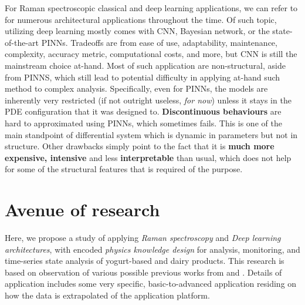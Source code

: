 \documentclass{iopjournal}
\begin{document}
For Raman spectroscopic classical and deep learning applications, we can refer to \cite{qi_recent_2023_progress,li_raman_2022,ren_raman_2023,poppe_deep_2024,deep_nodate-1as,fuentes_raman_2023,ibtehaz_ramannet_2023,gu_abstract_2024,moores2018bayesianmodellingquantificationraman,harkonen_bayesian_2020,han2018bayesianmodelingcomputationanalyte,chen2024acceleratingmolecularvibrationalspectra,Nair_2024,Brevi_2024,Liu_2023,Liu_2017,song_srs-net_2024} for numerous architectural applications throughout the time. Of such topic, utilizing deep learning mostly comes with CNN, Bayesian network, or the state-of-the-art PINNs. Tradeoffs are from ease of use, adaptability, maintenance, complexity, accuracy metric, computational costs, and more, but CNN is still the mainstream choice at-hand. Most of such application are non-structural, aside from PINNS, which still lead to potential difficulty in applying at-hand such method to complex analysis. Specifically, even for PINNs, the models are inherently very restricted (if not outright useless, \textit{for now}) unless it stays in the PDE configuration that it was designed to. \textbf{Discontinuous behaviours} are hard to approximated using PINNs, which sometimes fails. This is one of the main standpoint of differential system which is dynamic in parameters but not in structure. Other drawbacks simply point to the fact that it is \textbf{much more expensive, intensive} and less \textbf{interpretable} than usual, which does not help for some of the structural features that is required of the purpose. 

\section{Avenue of research}

Here, we propose a study of applying \textit{Raman spectroscopy} and \textit{Deep learning architectures}, with encoded \textit{physics knowledge design} for analysis, monitoring, and time-series state analysis of yogurt-based and dairy products. This research is based on observation of various possible previous works from \cite{CzajaBaranowskaMazurekSzostak2018,Karacaglar2019,Kolesov2021,ZhangEtAl2020_BayesYogurtRaman} and \cite{SilvaEtAl2021_RamanQualityDairy}. Details of application includes some very specific, basic-to-advanced application residing on how the data is extrapolated of the application platform. 
\end{document}
